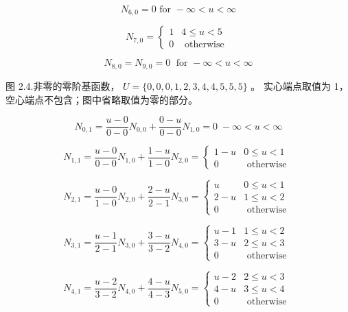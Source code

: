 \documentclass[../main.tex]{subfiles}
\begin{document}
\[
{N}_{6,0} = 0\text{ for } - \infty  < u < \infty
\]

\[
{N}_{7,0} = \left\{  \begin{array}{ll} 1 & 4 \leq  u < 5 \\  0 & \text{ otherwise } \end{array}\right.
\]

\[
{N}_{8,0} = {N}_{9,0} = 0\;\text{ for } - \infty  < u < \infty
\]

\begin{center}
\begin{minipage}{16cm}
\vspace*{.6\baselineskip}
\centering
{}
\par\smallskip
图 2.4.非零的零阶基函数， \(U = \{ 0,0,0,1,2,3,4,4,5,5,5\}\) 。 实心端点取值为 1，空心端点不包含；图中省略取值为零的部分。
\end{minipage}
\end{center}

\[
{N}_{0,1} = \frac{u - 0}{0 - 0}{N}_{0,0} + \frac{0 - u}{0 - 0}{N}_{1,0} = 0\; - \infty  < u < \infty
\]

\[
{N}_{1,1} = \frac{u - 0}{0 - 0}{N}_{1,0} + \frac{1 - u}{1 - 0}{N}_{2,0} = \left\{  \begin{array}{ll} 1 - u & 0 \leq  u < 1 \\  0 & \text{ otherwise } \end{array}\right.
\]

\[
{N}_{2,1} = \frac{u - 0}{1 - 0}{N}_{2,0} + \frac{2 - u}{2 - 1}{N}_{3,0} = \left\{  \begin{array}{ll} u & 0 \leq  u < 1 \\  2 - u & 1 \leq  u < 2 \\  0 & \text{ otherwise } \end{array}\right.
\]

\[
{N}_{3,1} = \frac{u - 1}{2 - 1}{N}_{3,0} + \frac{3 - u}{3 - 2}{N}_{4,0} = \left\{  \begin{array}{ll} u - 1 & 1 \leq  u < 2 \\  3 - u & 2 \leq  u < 3 \\  0 & \text{ otherwise } \end{array}\right.
\]

\[
{N}_{4,1} = \frac{u - 2}{3 - 2}{N}_{4,0} + \frac{4 - u}{4 - 3}{N}_{5,0} = \left\{  \begin{array}{ll} u - 2 & 2 \leq  u < 3 \\  4 - u & 3 \leq  u < 4 \\  0 & \text{ otherwise } \end{array}\right.
\]
\end{document}
